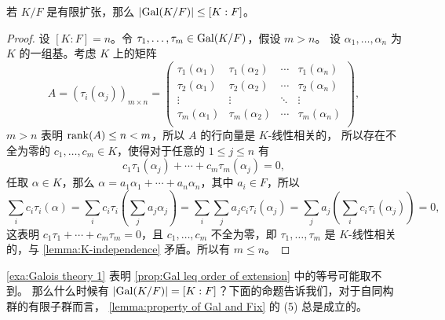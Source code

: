 \begin{proposition}\label{prop:Gal leq order of extension}
  若 $K/F$ 是有限扩张，那么 $\lvert\operatorname{Gal}(K/F)\rvert\leq [K:F]$。
\end{proposition}
\begin{proof}
  设 $[K:F]=n$。令 $\tau_1,\dots,\tau_m\in\operatorname{Gal}(K/F)$，假设 $m>n$。
  设 $\alpha_1,\dots,\alpha_n$ 为 $K$ 的一组基。考虑 $K$ 上的矩阵
  \[
    A=(\tau_i(\alpha_j))_{m\times n}=\begin{pmatrix}
      \tau_1(\alpha_1) & \tau_1(\alpha_2) & \cdots & \tau_1(\alpha_n) \\
      \tau_2(\alpha_1) & \tau_2(\alpha_2) & \cdots & \tau_2(\alpha_n) \\
      \vdots & \vdots & \ddots & \vdots \\
      \tau_m(\alpha_1) & \tau_m(\alpha_2) & \cdots & \tau_m(\alpha_n) \\
    \end{pmatrix}  ,
  \]
  $m>n$ 表明 $\operatorname{rank}(A)\leq n<m$，所以 $A$ 的行向量是 $K$-线性相关的，
  所以存在不全为零的 $c_1,\dots,c_m\in K$，使得对于任意的 $1\leq j\leq n$ 有
  \[
    c_1\tau_1(\alpha_j)+\cdots+c_m\tau_m(\alpha_j)=0,  
  \]
  任取 $\alpha\in K$，那么 $\alpha=a_1\alpha_1+\cdots+a_n\alpha_n$，其中
  $a_i\in F$，所以
  \begin{equation*}
    \sum_i c_i\tau_i(\alpha)=\sum_ic_i\tau_i\left(\sum_j a_j\alpha_j\right)
    =\sum_i\sum_j a_jc_i\tau_i(\alpha_j)=\sum_j a_j\left(\sum_i c_i\tau_i(\alpha_j)\right)=0,
  \end{equation*}
  这表明 $c_1\tau_1+\cdots+c_m\tau_m=0$，且 $c_1,\dots,c_m$ 不全为零，即
  $\tau_1,\dots,\tau_m$ 是 $K$-线性相关的，与 \autoref{lemma:K-independence}
  矛盾。所以有 $m\leq n$。
\end{proof}

\autoref{exa:Galois theory 1} 表明 \autoref{prop:Gal leq order of extension} 中的等号可能取不到。
那么什么时候有 $\lvert\operatorname{Gal}(K/F)\rvert=[K:F]$？下面的命题告诉我们，对于自同构群的有限子群而言，
\autoref{lemma:property of Gal and Fix} 的 (5) 总是成立的。

